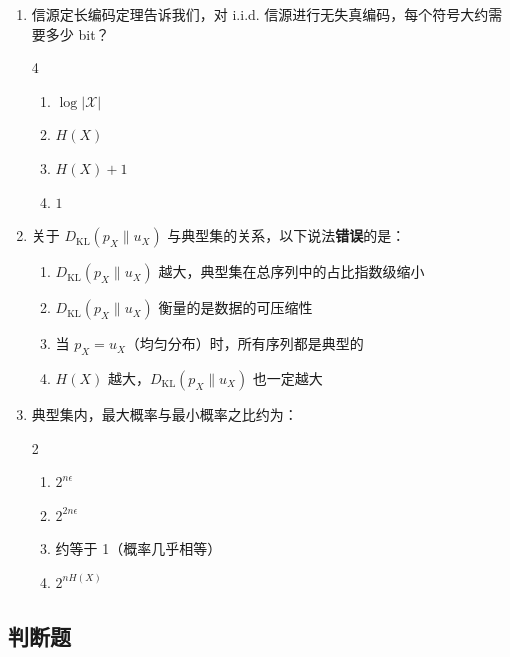 \documentclass[12pt,a4paper]{ctexart}
\newcommand{\XX}{\mathcal{X}}
\newcommand{\DKL}{D_{\mathrm{KL}}}
\begin{document}
\begin{enumerate}[label=\arabic*., leftmargin=*]
\item 信源定长编码定理告诉我们，对 i.i.d. 信源进行无失真编码，每个符号大约需要多少 bit？
\begin{multicols}{4}
\begin{enumerate}[label=(\Alph*)]
  \item $\log|\XX|$
  \item $H(X)$
  \item $H(X) + 1$
  \item $1$
\end{enumerate}
\end{multicols}

\item 关于 $\DKL(p_X\|u_X)$ 与典型集的关系，以下说法\textbf{错误}的是：
\begin{enumerate}[label=(\Alph*)]
  \item $\DKL(p_X\|u_X)$ 越大，典型集在总序列中的占比指数级缩小
  \item $\DKL(p_X\|u_X)$ 衡量的是数据的可压缩性
  \item 当 $p_X=u_X$（均匀分布）时，所有序列都是典型的
  \item $H(X)$ 越大，$\DKL(p_X\|u_X)$ 也一定越大
\end{enumerate}

\item 典型集内，最大概率与最小概率之比约为：
\begin{multicols}{2}
\begin{enumerate}[label=(\Alph*)]
  \item $2^{n\epsilon}$
  \item $2^{2n\epsilon}$
  \item 约等于 1（概率几乎相等）
  \item $2^{nH(X)}$
\end{enumerate}
\end{multicols}

\end{enumerate}

\subsection*{判断题}
\end{document}

